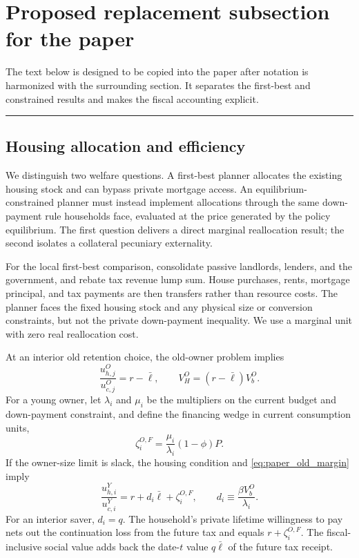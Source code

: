 \documentclass[11pt]{article}
\newcommand{\1}{\mathbf 1}
\newcommand{\ellbar}{\bar\ell}
\begin{document}
\section{Proposed replacement subsection for the paper}
\label{sec:replacement}

The text below is designed to be copied into the paper after notation is
harmonized with the surrounding section. It separates the first-best and
constrained results and makes the fiscal accounting explicit.

\vspace{0.4em}
\hrule
\vspace{0.6em}

\subsection*{Housing allocation and efficiency}

We distinguish two welfare questions. A first-best planner allocates the
existing housing stock and can bypass private mortgage access. An
equilibrium-constrained planner must instead implement allocations through the
same down-payment rule households face, evaluated at the price generated by
the policy equilibrium. The first question delivers a direct marginal
reallocation result; the second isolates a collateral pecuniary externality.

For the local first-best comparison, consolidate passive landlords, lenders,
and the government, and rebate tax revenue lump sum. House purchases, rents,
mortgage principal, and tax payments are then transfers rather than resource
costs. The planner faces the fixed housing stock and any physical size or
conversion constraints, but not the private down-payment inequality. We use a
marginal unit with zero real reallocation cost.

At an interior old retention choice, the old-owner problem implies
\begin{equation}
\frac{u_{h,j}^O}{u_{c,j}^O}=r-\ellbar,
\qquad
V_H^O=(r-\ellbar)V_b^O.
\label{eq:paper_old_margin}
\end{equation}
For a young owner, let $\lambda_i$ and $\mu_i$ be the multipliers on the
current budget and down-payment constraint, and define the financing wedge in
current consumption units,
\begin{equation}
\zeta_i^{O,F}=\frac{\mu_i}{\lambda_i}(1-\phi)P.
\label{eq:paper_finance_wedge}
\end{equation}
If the owner-size limit is slack, the housing condition and
\eqref{eq:paper_old_margin} imply
\begin{equation}
\frac{u_{h,i}^Y}{u_{c,i}^Y}
=r+d_i\ellbar+\zeta_i^{O,F},
\qquad
d_i\equiv\frac{\beta V_b^O}{\lambda_i}.
\label{eq:paper_young_margin}
\end{equation}
For an interior saver, $d_i=q$. The household's private lifetime willingness
to pay nets out the continuation loss from the future tax and equals
$r+\zeta_i^{O,F}$. The fiscal-inclusive social value adds back the date-$t$
value $q\ellbar$ of the future tax receipt.
\end{document}
